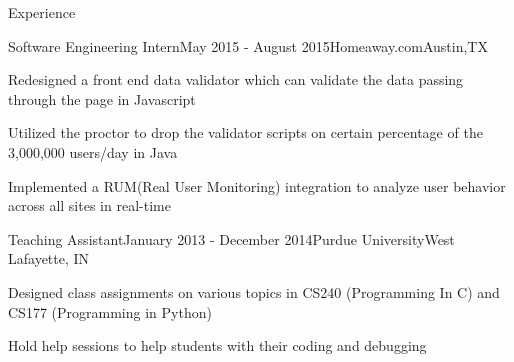 \documentclass{resume} %
\begin{document}
\begin{rSection}{Experience}

\begin{rSubsection}{Software Engineering Intern}{May 2015 - August 2015}{Homeaway.com}{Austin,TX}
\item Redesigned a front end data validator which can validate the data passing through the page in Javascript
\item Utilized the proctor to drop the validator scripts on certain percentage of the 3,000,000 users/day in Java
\item Implemented a RUM(Real User Monitoring) integration to analyze user behavior across all sites in real-time  
\end{rSubsection}

\begin{rSubsection}{Teaching Assistant}{January 2013 - December 2014}{Purdue University}{West Lafayette, IN}
\item Designed class assignments on various topics in CS240 (Programming In C) and CS177 (Programming in Python) 
\item Hold help sessions to help students with their coding and debugging
\end{rSubsection}


\end{rSection}


\end{document}
